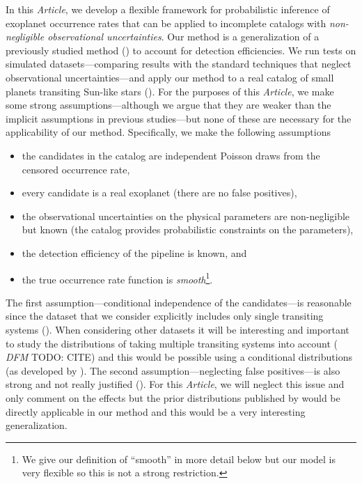 \documentclass[12pt,preprint]{aastex}
\newcommand{\paper}{\textsl{Article}}
\newcommand{\todo}[3]{{\color{#2} \emph{#1} TODO: #3}}
\newcommand{\dfmtodo}[1]{\todo{DFM}{red}{#1}}
\begin{document}
In this \paper, we develop a flexible framework for probabilistic inference of
exoplanet occurrence rates that can be applied to incomplete catalogs with
\emph{non-negligible observational uncertainties}.
Our method is a generalization of a previously studied method
(\citealt{hogge}) to account for detection efficiencies.
We run tests on simulated datasets---comparing results with the standard
techniques that neglect observational uncertainties---and apply our method to
a real catalog of small planets transiting Sun-like stars
(\citealt{petigura}).
For the purposes of this \paper, we make some strong assumptions---although we
argue that they are weaker than the implicit assumptions in previous
studies---but none of these are necessary for the applicability of our method.
Specifically, we make the following assumptions
\begin{itemize}

\item the candidates in the catalog are independent Poisson draws from the
censored occurrence rate,

\item every candidate is a real exoplanet (there are no false positives),

\item the observational uncertainties on the physical parameters are
non-negligible but known (the catalog provides probabilistic constraints on
the parameters),

\item the detection efficiency of the pipeline is known, and

\item the true occurrence rate function is \emph{smooth}\footnote{We give our
definition of ``smooth'' in more detail below but our model is very flexible
so this is not a strong restriction.}.

\end{itemize}
The first assumption---conditional independence of the candidates---is
reasonable since the dataset that we consider explicitly includes only single
transiting systems (\citealt{petigura}).
When considering other datasets it will be interesting and important to study
the distributions of taking multiple transiting systems into account
(\dfmtodo{CITE}) and this would be possible using a conditional distributions
(as developed by \citealt{tremaine}).
The second assumption---neglecting false positives---is also strong and not
really justified (\citealt{fressin-fp, morton}).
For this \paper, we will neglect this issue and only comment on the effects
but the prior distributions published by \citet{fressin-fp} would be directly
applicable in our method and this would be a very interesting generalization.
\end{document}
